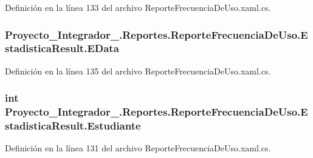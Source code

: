 Definición en la línea 133 del archivo Reporte\-Frecuencia\-De\-Uso.\-xaml.\-cs.

\hypertarget{struct_proyecto___integrador__3_1_1_reportes_1_1_reporte_frecuencia_de_uso_1_1_estadistica_result_a658dfafbad0962130a3ee73c8b5f1c4b}{
\subsubsection[{E\-Data}]{ Proyecto\-\_\-\-Integrador\-\_.\-Reportes.\-Reporte\-Frecuencia\-De\-Uso.\-Estadistica\-Result.\-E\-Data}}\label{struct_proyecto___integrador__3_1_1_reportes_1_1_reporte_frecuencia_de_uso_1_1_estadistica_result_a658dfafbad0962130a3ee73c8b5f1c4b}


Definición en la línea 135 del archivo Reporte\-Frecuencia\-De\-Uso.\-xaml.\-cs.

\hypertarget{struct_proyecto___integrador__3_1_1_reportes_1_1_reporte_frecuencia_de_uso_1_1_estadistica_result_a5e294c376eacca0ef132c57203b06e2d}{
\subsubsection[{Estudiante}]{\setlength{\rightskip}{0pt plus 5cm}int Proyecto\-\_\-\-Integrador\-\_.\-Reportes.\-Reporte\-Frecuencia\-De\-Uso.\-Estadistica\-Result.\-Estudiante}}\label{struct_proyecto___integrador__3_1_1_reportes_1_1_reporte_frecuencia_de_uso_1_1_estadistica_result_a5e294c376eacca0ef132c57203b06e2d}


Definición en la línea 131 del archivo Reporte\-Frecuencia\-De\-Uso.\-xaml.\-cs.

